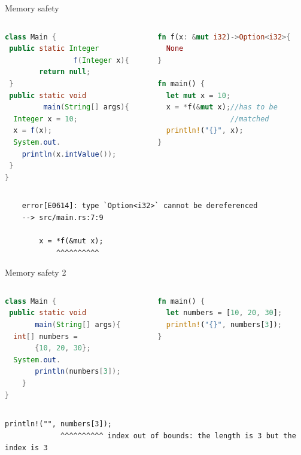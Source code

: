 \documentclass[10pt]{beamer}
\begin{document}
\begin{frame}[fragile]{Memory safety}
	\begin{columns}
        \begin{column}{0.5\textwidth}
            \begin{lstlisting}[language=java]
class Main {
 public static Integer 
                f(Integer x){
        return null;
 }
 public static void 
         main(String[] args){
  Integer x = 10;
  x = f(x);
  System.out.
    println(x.intValue());
 }
}
            \end{lstlisting}
        \end{column}
        
        \vrule{}
        \begin{column}{0.5\textwidth}
            \begin{lstlisting}[language=rust]
fn f(x: &mut i32)->Option<i32>{
  None
}

fn main() {
  let mut x = 10;
  x = *f(&mut x);//has to be 
                 //matched
  println!("{}", x);
}
            \end{lstlisting}
        
        \end{column}
    \end{columns}
    \begin{verbatim}
    error[E0614]: type `Option<i32>` cannot be dereferenced
    --> src/main.rs:7:9
    
        x = *f(&mut x);
            ^^^^^^^^^^
    \end{verbatim}
\end{frame}

\begin{frame}[fragile]{Memory safety 2}
   \begin{columns}
        \begin{column}{0.5\textwidth}
            \begin{lstlisting}[language=java]
class Main {
 public static void 
       main(String[] args){
  int[] numbers = 
       {10, 20, 30};
  System.out.
       println(numbers[3]);
    }
}
            \end{lstlisting}
        \end{column}
        
        \vrule{}
        \begin{column}{0.5\textwidth}
            \begin{lstlisting}[language=rust]
fn main() {
  let numbers = [10, 20, 30];
  println!("{}", numbers[3]);
}
            \end{lstlisting}
        
        \end{column}
    \end{columns}
    \texttt{println!("{}", numbers[3]);\\
   ~~~~~~~~~~~~~\^{}\^{}\^{}\^{}\^{}\^{}\^{}\^{}\^{}\^{} index out of bounds: the length is 3 but the index is 3
}
\end{frame}
\end{document}
